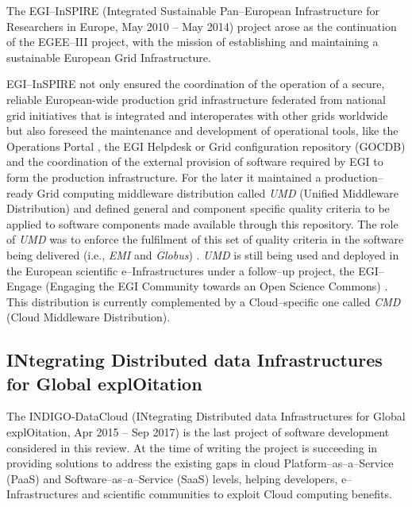 \documentclass[journal]{IEEEtran}
\begin{document}
The EGI--InSPIRE (Integrated Sustainable Pan--European Infrastructure for
Researchers in Europe, May 2010 -- May 2014) project \cite{cordis:egi-inspire}
arose as the continuation of the EGEE--III project, with the mission of establishing and
maintaining a sustainable European Grid Infrastructure.


EGI--InSPIRE not only ensured the coordination of the operation of a secure, reliable 
European-wide production grid infrastructure federated from national grid initiatives 
that is integrated and interoperates with other grids worldwide but also foreseed the 
maintenance and development of operational tools, like the Operations Portal \cite{egi-ops}, 
the EGI Helpdesk \cite{ggus} or Grid configuration repository (GOCDB) \cite{gocdb} and the 
coordination of the external provision of software required by EGI to 
form the production infrastructure. For the later it maintained a production--ready 
Grid computing middleware distribution called {\sl UMD} (Unified Middleware Distribution) and 
defined general and component specific quality criteria to be applied to software 
components made available through this repository.
The role of {\sl UMD} was to enforce the fulfilment of this set of quality
criteria \cite{egi-qc} in the software being delivered (i.e.,
{\sl EMI} and {\sl Globus}) \cite{mario}. {\sl UMD} is still being used and
deployed in the European scientific e--Infrastructures under a follow--up
project, the EGI--Engage (Engaging the EGI Community towards an Open Science
Commons) \cite{cordis:egi-engage}. This distribution is currently complemented
by a Cloud--specific one called {\sl CMD} (Cloud Middleware Distribution).

\subsection{INtegrating Distributed data Infrastructures for Global
explOitation}

The INDIGO-DataCloud (INtegrating Distributed data Infrastructures for Global
explOitation, Apr 2015 -- Sep 2017) \cite{cordis:indigo} is the last
project of software development considered in this review. At the time of writing
the project is succeeding in providing solutions to address the existing gaps in
cloud Platform--as--a--Service (PaaS) and Software--as--a--Service (SaaS) levels,
helping developers, e--Infrastructures and scientific communities to exploit
Cloud computing benefits.
\end{document}
